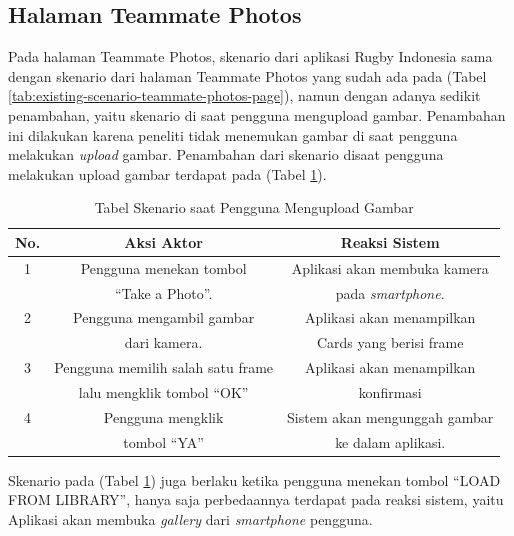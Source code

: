 

\subsection{Halaman Teammate Photos}
Pada halaman Teammate Photos, skenario dari aplikasi Rugby Indonesia sama dengan skenario dari halaman Teammate Photos yang sudah ada pada (Tabel \ref{tab:existing-scenario-teammate-photos-page}), namun dengan adanya sedikit penambahan, yaitu skenario di saat pengguna mengupload gambar. Penambahan ini dilakukan karena peneliti tidak menemukan gambar di saat pengguna melakukan \textit{upload} gambar. Penambahan dari skenario disaat pengguna melakukan upload gambar terdapat pada (Tabel \ref{tab:usulan-skenario-halaman-teammate-photos}).
\begin{table} [H]
    \centering
    \caption{Tabel Skenario saat Pengguna Mengupload Gambar}
    \begin{tabular}{|c|c|c|}
    \hline
       No. & Aksi Aktor & Reaksi Sistem  \\ \hline
        1 & Pengguna menekan tombol  & Aplikasi akan membuka kamera \\
         & ``Take a Photo''. & pada \textit{smartphone}. \\ \hline
        2 & Pengguna mengambil gambar & Aplikasi akan menampilkan \\ 
         & dari kamera. & Cards yang berisi frame \\ \hline
        3 & Pengguna memilih salah satu frame & Aplikasi akan menampilkan \\ 
         & lalu mengklik tombol ``OK'' & konfirmasi \\ \hline
        4 & Pengguna mengklik & Sistem akan mengunggah gambar \\ 
         & tombol ``YA'' & ke dalam aplikasi. \\ \hline
    \end{tabular}
    \label{tab:usulan-skenario-halaman-teammate-photos}
\end{table}

Skenario pada (Tabel \ref{tab:usulan-skenario-halaman-teammate-photos}) juga berlaku ketika pengguna menekan tombol ``LOAD FROM LIBRARY'', hanya saja perbedaannya terdapat pada reaksi sistem, yaitu Aplikasi akan membuka \textit{gallery} dari \textit{smartphone} pengguna.

